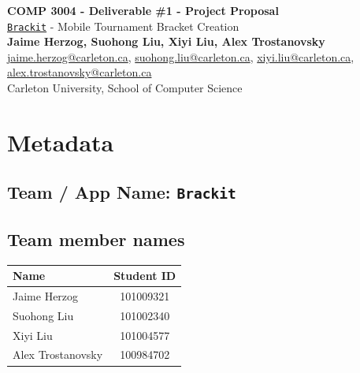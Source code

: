 \documentclass{article}
\begin{document}
\begin{center}


    \LARGE{\textbf{COMP 3004 - Deliverable \#1 - Project Proposal}} \\
    \vspace{1em}
    \Large{\href{https://github.com/alextrosta/brackit}{\texttt{Brackit}} - Mobile Tournament Bracket Creation} \\
    \vspace{1em}
    \normalsize\textbf{Jaime Herzog, Suohong Liu, Xiyi Liu, Alex Trostanovsky} \\
    \normalsize{
        \href{mailto:jaime.herzog@carleton.ca}{jaime.herzog@carleton.ca},
        \href{mailto:suohong.liu@carleton.ca}{suohong.liu@carleton.ca},
        \href{mailto:xiyi.liu@carleton.ca}{xiyi.liu@carleton.ca},
        \href{mailto:alex.trostanovsky@carleton.ca}{alex.trostanovsky@carleton.ca}
    } \\
    \vspace{1em}
    \normalsize{Carleton University, School of Computer Science} \\

\end{center}
\begin{normalsize}

\end{normalsize}

\section*{Metadata}
\subsection*{Team / App Name: \texttt{Brackit}}
\subsection*{Team member names}
\begin{center}
    \begin{tabular}{ |l|c| }
        \hline
        \textbf{Name}     & \textbf{Student ID} \\
        \hline
        Jaime Herzog      & 101009321           \\
        Suohong Liu       & 101002340           \\
        Xiyi Liu          & 101004577           \\
        Alex Trostanovsky & 100984702           \\
        \hline
    \end{tabular}
\end{center}
\end{document}
